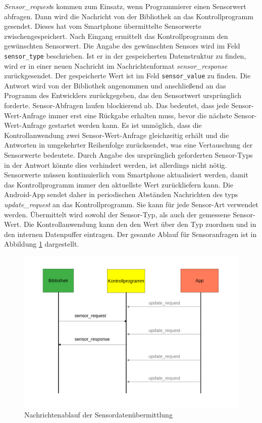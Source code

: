 \documentclass[11pt,a4paper]{report}
\begin{document}
\textit{Sensor\_request}s kommen zum Einsatz, wenn Programmierer einen Sensorwert abfragen.
Dann wird die Nachricht von der Bibliothek an das Kontrollprogramm gesendet.
Dieses hat vom Smartphone übermittelte Sensorwerte zwischengespeichert.
Nach Eingang ermittelt das Kontrollprogramm den gewünschten Sensorwert.
Die Angabe des gewünschten Sensors wird im Feld \texttt{sensor\_type} beschrieben.
Ist er in der gespeicherten Datenstruktur zu finden, wird er in einer neuen Nachricht im Nachrichtenformat \textit{sensor\_response} zurückgesendet.
Der gespeicherte Wert ist im Feld \texttt{sensor\_value} zu finden.
Die Antwort wird von der Bibliothek angenommen und anschließend an das Programm des Entwicklers zurückgegeben, das den Sensortwert ursprünglich forderte.
Sensor-Abfragen laufen blockierend ab.
Das bedeutet, dass jede Sensor-Wert-Anfrage immer erst eine Rückgabe erhalten muss, bevor die nächste Sensor-Wert-Anfrage gestartet werden kann.
Es ist unmöglich, dass die Kontrollanwendung zwei Sensor-Wert-Anfrage gleichzeitig erhält und die Antworten in umgekehrter Reihenfolge zurücksendet, was eine Vertauschung der Sensorwerte bedeutete.
Durch  Angabe des ursprünglich geforderten Sensor-Typs in der Antwort könnte dies verhindert werden, ist allerdings nicht nötig.
Sensorwerte müssen kontinuierlich vom Smartphone aktualisiert werden, damit das Kontrollprogramm immer den aktuellste Wert zurückliefern kann.
Die Android-App sendet daher in periodischen Abständen Nachrichten des typs \textit{update\_request} an das Kontrollprogramm.
Sie kann für jede Sensor-Art verwendet werden.
Übermittelt wird sowohl der Sensor-Typ, als auch der gemessene Sensor-Wert.
Die Kontrollanwendung kann den den Wert über den Typ zuordnen und in den internen Datenpuffer eintragen.
Der gesamte Ablauf für Sensoranfragen ist in Abbildung \ref{fig:message_flow_requests} dargestellt.
\begin{figure}[htbp]
\centering
\includegraphics[width=.9\textwidth]{images/message_flow_sensor.pdf}
\caption{Nachrichtenablauf der Sensordatenübermittlung}
\label{fig:message_flow_requests}
\end{figure}
\end{document}
